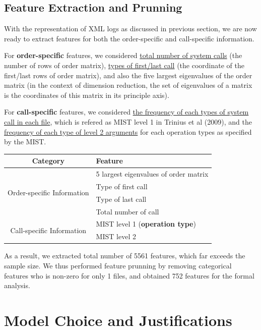 \documentclass[11pt]{article}
\theoremstyle{definition}
\begin{document}
\subsection{\textbf{Feature Extraction and Prunning}}
With the representation of XML logs as discussed in previous section, we are now ready to extract features for both the order-specific and call-specific information.

For \textbf{order-specific} features, we considered \underline{total number of system calls} (the number of rows of order matrix), \underline{types of first/last call} (the coordinate of the first/last rows of order matrix), and also the five largest eigenvalues of the order matrix (in the context of dimension reduction, the set of eigenvalues of a matrix is the coordinates of this matrix in its principle axis). 

For \textbf{call-specific} features, we considered \underline{the frequency of each types of system call in each file}, which is refered as MIST level 1 in Trinius et al (2009), and the \underline{frequency of each type of level 2 arguments} for each operation types as specified by the MIST. 

\begin{table}[ht]
\centering
\begin{tabular}{ |c|l| }
\hline
Category  & Feature  \\ \hline
\multirow{4}{*}{Order-specific Information} 
 & 5 largest eigenvalues of order matrix  \\
   & Type of first call   \\
   & Type of last call   \\
   & Total number of call   \\\hline
 \multirow{2}{*}{Call-specific Information} 
  & MIST level 1 (\textbf{operation type})  \\
  & MIST level 2   \\\hline
\end{tabular}
\end{table}

As a result, we extracted total number of 5561 features, which far exceeds the sample size. We thus performed feature prunning by removing categorical features who is non-zero for only 1 files, and obtained 752 features for the formal analysis.

\section{\textbf{Model Choice and Justifications}}
\end{document}
